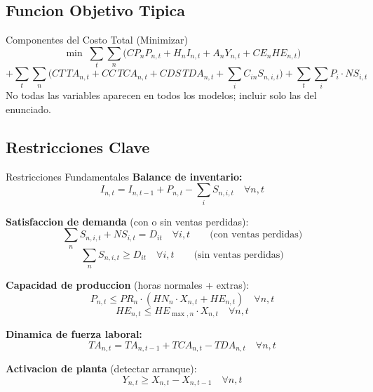 \documentclass[11pt, a4paper]{article}
\begin{document}
\subsection{Funcion Objetivo Tipica}

\begin{formulas}{Componentes del Costo Total (Minimizar)}
  \[
    \min \; \sum_t \sum_n \Big(
      CP_n P_{n,t} + H_n I_{n,t} + A_n Y_{n,t} + CE_n HE_{n,t}
    \Big)
  \]
  \[
    + \sum_t \sum_n \Big(
      CT\, TA_{n,t} + CC\, TCA_{n,t} + CDS\, TDA_{n,t}
      + \textstyle\sum_i C_{in} S_{n,i,t}
    \Big)
    + \sum_t \sum_i P_i \cdot NS_{i,t}
  \]
  No todas las variables aparecen en todos los modelos; incluir solo las del enunciado.
\end{formulas}

\subsection{Restricciones Clave}

\begin{formulas}{Restricciones Fundamentales}
  \textbf{Balance de inventario:}
  \[
    I_{n,t} = I_{n,t-1} + P_{n,t} - \sum_i S_{n,i,t} \quad \forall n, t
  \]

  \textbf{Satisfaccion de demanda} (con o sin ventas perdidas):
  \[
    \sum_n S_{n,i,t} + NS_{i,t} = D_{it} \quad \forall i, t
    \qquad \text{(con ventas perdidas)}
  \]
  \[
    \sum_n S_{n,i,t} \ge D_{it} \quad \forall i, t
    \qquad \text{(sin ventas perdidas)}
  \]

  \textbf{Capacidad de produccion} (horas normales + extras):
  \[
    P_{n,t} \le PR_n \cdot (HN_n \cdot X_{n,t} + HE_{n,t}) \quad \forall n, t
  \]
  \[
    HE_{n,t} \le HE_{\max,n} \cdot X_{n,t} \quad \forall n, t
  \]

  \textbf{Dinamica de fuerza laboral:}
  \[
    TA_{n,t} = TA_{n,t-1} + TCA_{n,t} - TDA_{n,t} \quad \forall n, t
  \]

  \textbf{Activacion de planta} (detectar arranque):
  \[
    Y_{n,t} \ge X_{n,t} - X_{n,t-1} \quad \forall n, t
  \]
\end{formulas}
\end{document}
